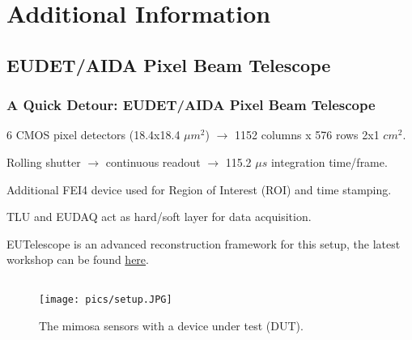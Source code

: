 \documentclass{beamer}
\begin{document}
\section{Additional Information}
\subsection{EUDET/AIDA Pixel Beam Telescope}
\begin{frame}
\frametitle{ A Quick Detour: EUDET/AIDA Pixel Beam Telescope}
\begin{itemize}
\small{
\item 6 CMOS pixel detectors (18.4x18.4 $\mu m^{2}$) $\rightarrow$ 1152 columns x 576 rows 2x1 $cm^2$.
\item Rolling shutter $\rightarrow$ continuous readout $\rightarrow$ 115.2 $\mu s$ integration time/frame.
\item Additional FEI4 device used for Region of Interest (ROI) and time stamping.
\item TLU and EUDAQ act as hard/soft layer for data acquisition.
\item EUTelescope is an advanced reconstruction framework for this setup, the latest workshop can be found \href{https://indico.desy.de/conferenceDisplay.py?ovw=True&confId=10685}{here}.
}
\end{itemize}
\begin{figure}
  \begin{columns}
        \texttt{[image: pics/setup.JPG]}
        \label{fig:example left}
        \caption{The mimosa sensors with a device under test (DUT).}
      \end{columns}
\end{figure}
\end{frame}
\end{document}
